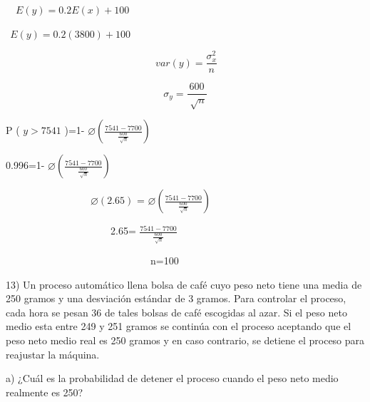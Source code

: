 \documentclass[10pt,a4paper]{article}
\begin{document}
\begin{flushleft}
\begin{multicols}{2}
		\ \   \( E \left( y \right) =0.2E \left( x \right) +100 \) \ \  \par
		
		\( ~~ E \left( y \right) =0.2 \left( 3800 \right) +100 \) \ \  \par
		
		
		\vspace{\baselineskip} \[  \]  \[ ~ var \left( y \right) =\frac{ \sigma _{x}^{2}}{n} \] \par
		
		\[  \]  \[  \sigma _{y}=\frac{600}{\sqrt[]{n}} \] \par
		
		P ( \( y>7541 \) )=1- \(  \varnothing  \left( \frac{7541-7700}{\frac{600}{\sqrt[]{n}}} \right)  \) \par
		
		
		\vspace{\baselineskip} \tabto{1.48in} 0.996=1- \(  \varnothing  \left( \frac{7541-7700}{\frac{600}{\sqrt[]{n}}} \right)  \) \par
		
		\ \ \ \ \ \ \ \ \ \ \ \ \ \ \ \ \   \(  \varnothing  \left( 2.65 \right)  \) = \(  \varnothing  \left( \frac{7541-7700}{\frac{600}{\sqrt[]{n}}} \right)  \) \par
		
		\ \ \ \ \ \ \ \ \ \ \ \ \ \ \ \ \ \ \ \ \  2.65= \( \frac{7541-7700}{\frac{600}{\sqrt[]{n}}} \) \par
		
		\ \ \ \ \ \ \ \ \ \ \ \ \ \ \ \ \ \ \ \ \ \ \ \ \ \ \ \ \  n=100\par
		
		
		\vspace{\baselineskip}
	\end{multicols}
	
	\vspace{\baselineskip}
	\vspace{\baselineskip}\begin{justify}
		
	13) Un proceso automático llena bolsa de café cuyo peso neto tiene una media de 250 gramos y una desviación estándar de 3 gramos. Para controlar el proceso, cada hora se pesan 36 de tales bolsas de café escogidas al azar. Si el peso neto medio esta entre 249 y 251 gramos se continúa con el proceso aceptando que el peso neto medio real es 250 gramos y en caso contrario, se detiene el proceso para reajustar la máquina.
	
	\begin{justify}
		a) ¿Cuál es la probabilidad de detener el proceso cuando el peso neto medio realmente es 250?
	\end{justify}\par
	

\end{justify}
\end{flushleft}
\end{document}
